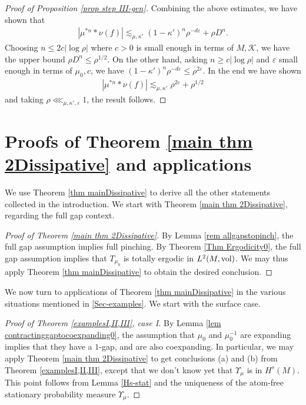 \documentclass[11pt, leqno, fleqn]{amsart}
\def\eps{\varepsilon}
\newcommand{\margem}[1]{\marginpar{{\scriptsize {#1}}}}
\newcommand{\SectionSymbol}{\textsection}
\newcommand{\cK}{{\mathcal K}}
\theoremstyle{definition}
\theoremstyle{definition}
\def \vol{  {\rm vol} }
\begin{document}
\begin{proof}[Proof of Proposition \ref{prop step III-gen}]
Combining the above estimates, we have shown that 	
\begin{align*}
| \mu^{*n}*\nu(f)|\lesssim_{ \mu, \kappa'} (1-\kappa')^n\rho^{-d\eps} + \rho D^n.
\end{align*}
Choosing $n \leq 2c |\log \rho|$ where $c>0$ is small enough in terms of $M, \cK$, we have the upper bound $\rho D^n\leq \rho^{1/2}$. On the other hand, asking $n \geq c |\log \rho|$ and $\eps$ small enough in terms of $\mu_{0}, c$, we have $(1-\kappa')^n\rho^{- d \eps}\leq \rho^{2\eps}$. In the end we have shown
\begin{align*}
| \mu^{*n}*\nu(f)|\lesssim_{\mu, \kappa'}  \rho^{2\eps}+\rho^{1/2}
\end{align*}
and taking $\rho\lll_{ \mu, \kappa', \eps}1$, the result follows. 
 	\end{proof}


	
	






 	
 \section{Proofs of Theorem  \ref{main thm 2Dissipative} and applications} \label{sec Proofs123}
	
We use Theorem \ref{thm mainDissipative} to derive all the other statements collected in the introduction. We start with Theorem \ref{main thm 2Dissipative}, regarding the full gap context. 	
	
	\begin{proof}[Proof of Theorem \ref{main thm 2Dissipative}]
By Lemma \ref{rem allgapstopinch}, the full gap assumption implies full pinching. By Theorem  \ref{Thm Ergodicity0}, the full gap assumption implies that $T_{\mu_{0}}$ is totally ergodic in $L^2(M, \vol)$. We may thus apply Theorem \ref{thm mainDissipative} to obtain the desired conclusion. 
\end{proof}
	
	We now turn to applications of Theorem \ref{thm mainDissipative} in the various  situations mentioned in \SectionSymbol \ref{Sec-examples}. We start with the surface case.
	
	\begin{proof}[Proof of Theorem \ref{examplesI,II,III}, case I] 
	
 
		By Lemma \ref{lem contractinggaptocoexpanding0}, the assumption that  $\mu_0$ and $\mu_0^{-1}$ are expanding implies that they have a $1$-gap, and are also coexpanding. In particular, we may apply Theorem \ref{main thm 2Dissipative} to get conclusions (a) and (b) from Theorem \ref{examplesI,II,III}, except that we don't know yet that $\Upsilon_{\mu}$ is in $H^s(M)$. This point follows from Lemma \ref{Hs-stat} and the uniqueness of the atom-free stationary probability measure $\Upsilon_{\mu}$.
		
	
	\end{proof}
\end{document}
